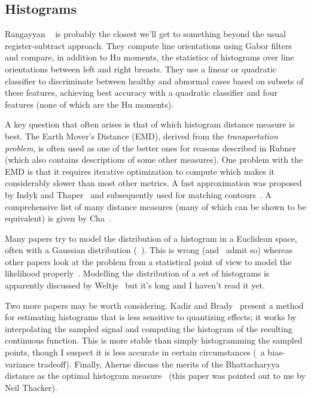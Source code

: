 \subsection{Histograms}
Rangayyan \etal~\cite{Rangayyan_etal_JEI07} is probably the closest we'll get to something beyond the usual register-subtract approach. They compute line orientations using Gabor filters and compare, in addition to Hu moments, the statistics of histograms over line orientations between left and right breasts. They use a linear or quadratic classifier to discriminate between healthy and abnormal cases based on subsets of these features, achieving best accuracy with a quadratic classifier and four features (none of which are the Hu moments).

A key question that often arises is that of which histogram distance measure is best. The Earth Mover's Distance (EMD), derived from the \emph{transportation problem}, is often used as one of the better ones for reasons described in Rubner \etal~\cite{Rubner_etal_IJCV00} (which also contains descriptions of some other measures). One problem with the EMD is that it requires iterative optimization to compute which makes it considerably slower than most other metrics. A fast approximation was proposed by Indyk and Thaper~\cite{Indyk_Thaper_SCTV03} and subsequently used for matching contours~\cite{Grauman_Darrell_CVPR04}. A comprehensive list of many distance measures (many of which can be shown to be equivalent) is given by Cha~\cite{Cha_IJMMMAS07}.

Many papers try to model the distribution of a histogram in a Euclidean space, often with a Gaussian distribution (\eg~\cite{Broadhurst_etal_DSSCV05}). This is wrong (and~\cite{Broadhurst_etal_DSSCV05} admit so) whereas other papers look at the problem from a statistical point of view to model the likelihood properly~\cite{Vermeesch_JGR05}. Modelling the distribution of a set of histograms is apparently discussed by Weltje~\cite{Weltje_ESR02} but it's long and I haven't read it yet.

Two more papers may be worth considering. Kadir and Brady~\cite{Kadir_Brady_TR05} present a method for estimating histograms that is less sensitive to quantizing effects; it works by interpolating the sampled signal and computing the histogram of the resulting continuous function. This is more stable than simply histogramming the sampled points, though I suspect it is less accurate in certain circumstances (\ie~a bias-variance tradeoff). Finally, Aherne \etal discuss the merits of the Bhattacharyya distance as the optimal histogram measure~\cite{Aherne_etal_Kybernetika97} (this paper was pointed out to me by Neil Thacker).


